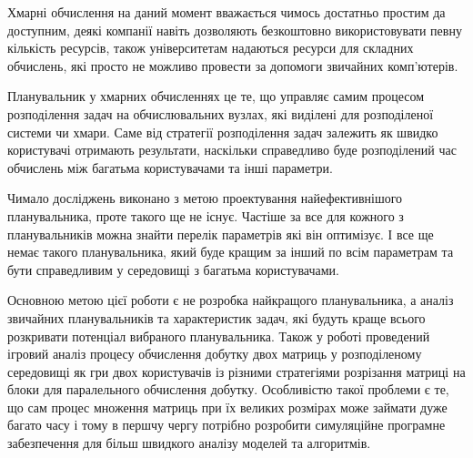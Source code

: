 
Хмарні обчислення на даний момент вважається чимось достатньо простим да доступним, деякі компанії навіть дозволяють безкоштовно використовувати певну кількість ресурсів, також університетам надаються ресурси для складних обчислень, які просто не можливо провести за допомоги звичайних комп'ютерів.

Планувальник у хмарних обчисленнях це те, що управляє самим процесом розподілення задач на обчислювальних вузлах, які виділені для розподіленої системи чи хмари. Саме від стратегії розподілення задач залежить як швидко користувачі отримають результати, наскільки справедливо буде розподілений час обчислень між багатьма користувачами та інші параметри.

Чимало досліджень виконано з метою проектування найефективнішого планувальника, проте такого ще не існує. Частіше за все для кожного з планувальників можна знайти перелік параметрів які він оптимізує. І все ще немає такого планувальника, який буде кращим за інший по всім параметрам та бути справедливим у середовищі з багатьма користувачами.

Основною метою цієї роботи є не розробка найкращого планувальника, а аналіз звичайних планувальників та характеристик задач, які будуть краще всього розкривати потенціал вибраного планувальника. Також у роботі проведений ігровий аналіз процесу обчислення добутку двох матриць у розподіленому середовищі як гри двох користувачів із різними стратегіями розрізання матриці на блоки для паралельного обчислення добутку. Особливістю такої проблеми є те, що сам процес множення матриць при їх великих розмірах може займати дуже багато часу і тому в першчу чергу потрібно розробити симуляційне програмне забезпечення для більш швидкого аналізу моделей та алгоритмів.